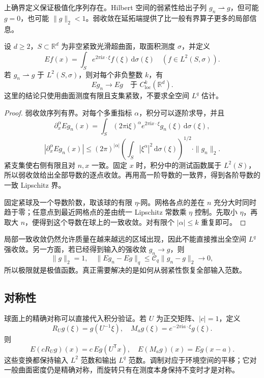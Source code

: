 上确界定义保证极值化序列存在。Hilbert 空间的弱紧性给出子列 \(g_n\rightharpoonup g\)，但可能 \(g=0\)，也可能 \(\|g\|_2<1\)。弱收敛在延拓端提供了比一般有界算子更多的局部信息。

\begin{lemma}[弱输入收敛与局部延拓紧性]\label{b2:lem:23-local-extension-compactness}
设 \(d\geq2\)，\(S\subset\mathbb R^d\) 为非空紧致光滑超曲面，取面积测度 \(\sigma\)，并定义
\[
 Ef(x)=\int_S e^{2\pi\mathrm i x\cdot\xi}f(\xi)\,\mathrm d\sigma(\xi)
 \quad(f\in L^2(S,\sigma)).
\]
若 \(g_n\rightharpoonup g\) 于 \(L^2(S,\sigma)\)，则对每个非负整数 \(k\)，有
\[
 Eg_n\longrightarrow Eg\quad\text{于 }C^k_{\mathrm{loc}}(\mathbb R^d).
\]
这里的结论只使用曲面测度有限且支集紧致，不要求全空间 \(L^q\) 估计。
\end{lemma}
\begin{proof}
弱收敛序列有界。对每个多重指标 \(\alpha\)，积分可以逐阶求导，并且
\[
 \partial_x^\alpha Eg_n(x)
 =\int_S(2\pi\mathrm i\xi)^\alpha
       e^{2\pi\mathrm i x\cdot\xi}g_n(\xi)\,\mathrm d\sigma(\xi),
\]
\[
 |\partial_x^\alpha Eg_n(x)|
 \leq(2\pi)^{|\alpha|}
       \left(\int_S|\xi^\alpha|^2\,\mathrm d\sigma(\xi)\right)^{1/2}
       \cdot\|g_n\|_2.
\]
紧支集使右侧有限且对 \(n,x\) 一致。固定 \(x\) 时，积分中的测试函数属于 \(L^2(S)\)，所以弱收敛给出全部导数的逐点收敛。再用高一阶导数的一致界，得到各阶导数的一致 Lipschitz 界。

固定紧球及一个导数阶数，取该球的有限 \(\eta\)-网。网格各点的差在 \(n\) 充分大时同时趋于零；任意点到最近网格点的差由统一 Lipschitz 常数乘 \(\eta\) 控制。先取小 \(\eta\)，再取大 \(n\)，便得到这个导数在球上的一致收敛。对有限个 \(|\alpha|\leq k\) 重复即可。
\end{proof}

局部一致收敛仍然允许质量在越来越远的区域出现，因此不能直接推出全空间 \(L^q\) 强收敛。另一方面，若已经得到输入的强收敛 \(g_n\to g\)，则
\[
 \|g\|_2=1,\quad
 \|Eg_n-Eg\|_q\leq\mathcal C_q\|g_n-g\|_2\longrightarrow0,
\]
所以极限就是极值函数。真正需要解决的是如何从弱紧性恢复全部输入范数。

\subsection{对称性}
\label{b2:subsec:230503}

球面上的精确对称可以直接代入积分验证。若 \(U\) 为正交矩阵、\(|c|=1\)，定义
\[
 R_Ug(\xi)=g(U^{-1}\xi),\quad
 M_ag(\xi)=e^{-2\pi\mathrm i a\cdot\xi}g(\xi).
\]
则
\[
 E(cR_Ug)(x)=c\,Eg(U^{\mathsf T}x),\quad
 E(M_ag)(x)=Eg(x-a).
\]
这些变换都保持输入 \(L^2\) 范数和输出 \(L^q\) 范数。调制对应于环境空间的平移；它对一般曲面密度仍是精确对称，而旋转只有在测度本身保持不变时才是对称。

